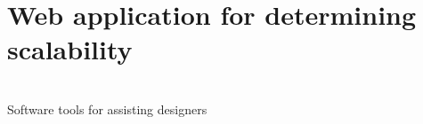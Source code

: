 \section{Web application for determining scalability}
\begin{frame}[c,noframenumbering]
	\centering
	\begin{titleblock}{}
		~\\%
		{\centering\LARGE Software tools for assisting designers\\}%
		~\\%
	\end{titleblock}
\end{frame}
